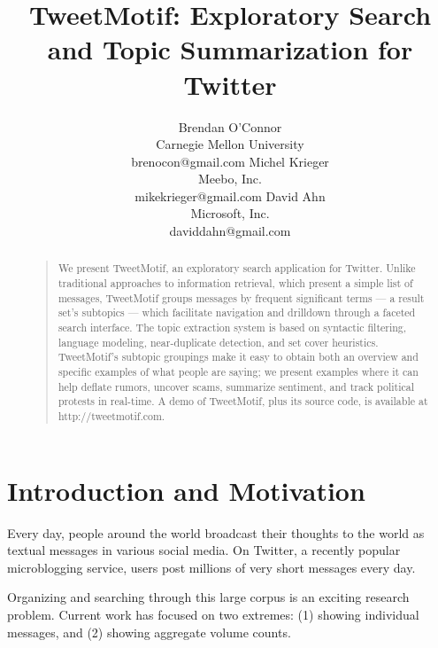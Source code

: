 \documentclass[letterpaper]{article}
\newcommand{\bto}[1]{\textcolor{blue}{\textbf{[#1 --BTO]}}}
\begin{document}
%
\title{TweetMotif: Exploratory Search and Topic Summarization for Twitter}
\author{Brendan O'Connor \\ 
Carnegie Mellon University \\ brenocon@gmail.com
\And
Michel Krieger \\ Meebo, Inc. \\ mikekrieger@gmail.com
\And
David Ahn \\ Microsoft, Inc. \\ daviddahn@gmail.com
}
\maketitle
\begin{abstract}
\begin{quote}
We present TweetMotif, an exploratory search application for Twitter.  Unlike traditional approaches to information retrieval, which present a simple list of messages, TweetMotif groups messages by frequent significant terms --- a result set's subtopics --- which facilitate navigation and drilldown through a faceted search interface.  The topic extraction system is based on syntactic filtering, language modeling, near-duplicate detection, and set cover heuristics.  TweetMotif's subtopic groupings make it easy to obtain both an overview and specific examples of what people are saying; we present examples where it can help deflate rumors, uncover scams, summarize sentiment, and track political protests in real-time.   A demo of TweetMotif, plus its source code, is available at http://tweetmotif.com.
\end{quote}
\end{abstract}

\section{Introduction and Motivation}


Every day, people around the world broadcast their thoughts to the world as textual messages in various social media.  On Twitter, a recently popular microblogging service, users post millions of very short messages every day.

Organizing and searching through this large corpus is an exciting research problem. Current work has focused on two extremes: (1) showing individual messages, and (2) showing aggregate volume counts.
\end{document}
